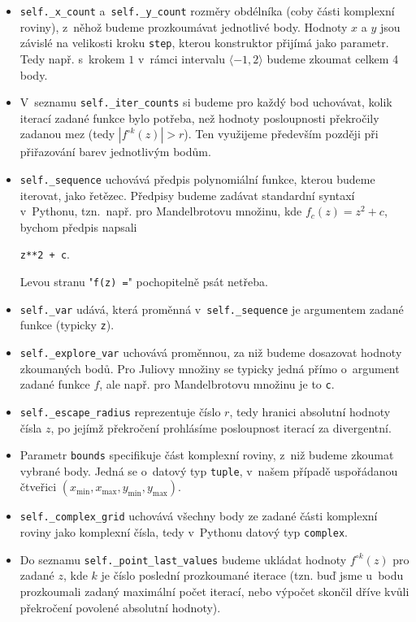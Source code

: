 \begin{itemize}
    \item \texttt{self.\_x\_count} a~\texttt{self.\_y\_count} rozměry obdélníka (coby části komplexní roviny), z~něhož budeme prozkoumávat jednotlivé body. Hodnoty $x$ a $y$ jsou závislé na velikosti kroku \texttt{step}, kterou konstruktor přijímá jako parametr. Tedy např. s~krokem $1$ v~rámci intervalu $\langle-1,2\rangle$ budeme zkoumat celkem 4 body.
    \item V~seznamu \texttt{self.\_iter\_counts} si budeme pro každý bod uchovávat, kolik iterací zadané funkce bylo potřeba, než hodnoty posloupnosti překročily zadanou mez (tedy $|f^{\circ k}(z)|>r$). Ten využijeme především později při přiřazování barev jednotlivým bodům.
    \item \texttt{self.\_sequence} uchovává předpis polynomiální funkce, kterou budeme iterovat, jako řetězec. Předpisy budeme zadávat standardní syntaxí v~Pythonu, tzn.~např. pro Mandelbrotovu množinu, kde $f_c(z)=z^2+c$, bychom předpis napsali
    \begin{center}
        \texttt{z**2 + c}.
    \end{center}
    Levou stranu "\texttt{f(z) =}" pochopitelně psát netřeba.
    \item \texttt{self.\_var} udává, která proměnná v~\texttt{self.\_sequence} je argumentem zadané funkce (typicky \texttt{z}).
    \item \texttt{self.\_explore\_var} uchovává proměnnou, za niž budeme dosazovat hodnoty zkoumaných bodů. Pro Juliovy množiny se typicky jedná přímo o~argument zadané funkce $f$, ale např. pro Mandelbrotovu množinu je to \texttt{c}.
    \item \texttt{self.\_escape\_radius} reprezentuje číslo $r$, tedy hranici absolutní hodnoty čísla $z$, po jejímž překročení prohlásíme posloupnost iterací za divergentní.
    \item Parametr \texttt{bounds} specifikuje část komplexní roviny, z~niž budeme zkoumat vybrané body. Jedná se o~datový typ \texttt{tuple}, v~našem případě uspořádanou čtveřici $(x_{\text{min}},x_{\text{max}},y_{\text{min}},y_{\text{max}})$.
    \item \texttt{self.\_complex\_grid} uchovává všechny body ze zadané části komplexní roviny jako komplexní čísla, tedy v~Pythonu datový typ \texttt{complex}.
    \item Do seznamu \texttt{self.\_point\_last\_values} budeme ukládat hodnoty $f^{\circ k}(z)$ pro zadané $z$, kde $k$ je číslo poslední prozkoumané iterace (tzn. buď jsme u~bodu prozkoumali zadaný maximální počet iterací, nebo výpočet skončil dříve kvůli překročení povolené absolutní hodnoty).
\end{itemize}
